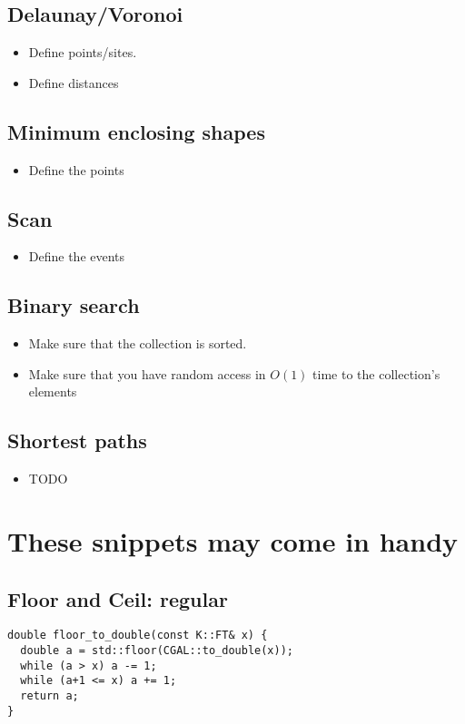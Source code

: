 \documentclass[guide.tex]{subfiles}
\begin{document}
\subsection{Delaunay/Voronoi}
\begin{itemize}
  \item Define points/sites.
  \item Define distances
\end{itemize}

\subsection{Minimum enclosing shapes}
\begin{itemize}
  \item Define the points
\end{itemize}

\subsection{Scan}
\begin{itemize}
  \item Define the events
\end{itemize}

\subsection{Binary search}
\begin{itemize}
  \item Make sure that the collection is sorted.
  \item Make sure that you have random access in $O(1)$ time to the collection's elements
\end{itemize}

\subsection{Shortest paths}
\begin{itemize}
  \item TODO
\end{itemize}

\section{These snippets may come in handy}

\subsection{Floor and Ceil: regular}
\begin{verbatim}
double floor_to_double(const K::FT& x) {
  double a = std::floor(CGAL::to_double(x));
  while (a > x) a -= 1;
  while (a+1 <= x) a += 1;
  return a;
}
\end{verbatim}
\end{document}
